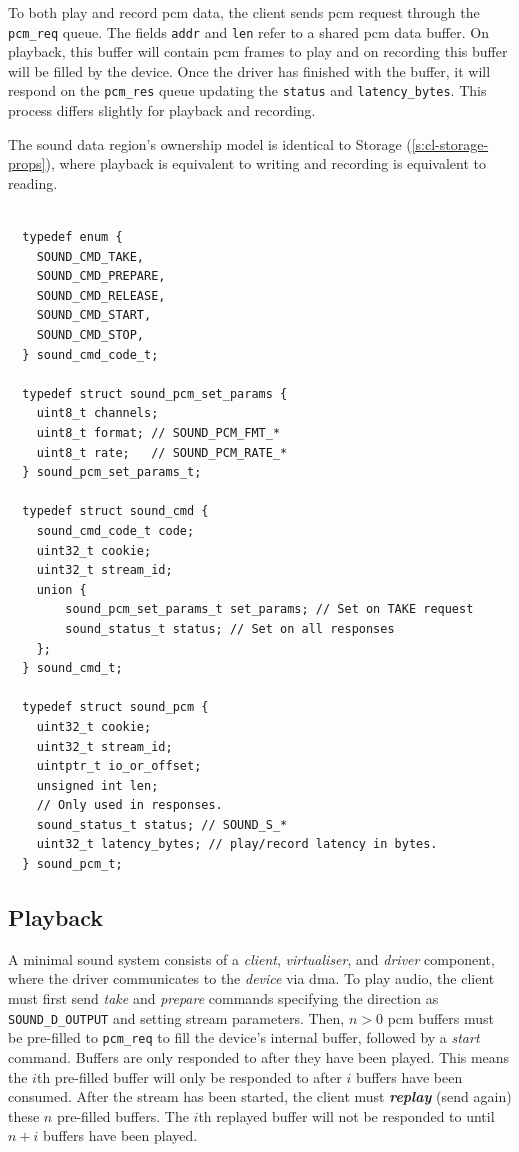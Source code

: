 \documentclass[a4paper,12pt]{report}
\newcommand{\code}[1]{\texttt{#1}}
\begin{document}
To both play and record \gls{pcm} data, the client sends \gls{pcm} request through the
\code{pcm\_req} queue. The fields \code{addr} and \code{len} refer to a shared
\gls{pcm} data buffer. On playback, this buffer will contain \gls{pcm} frames to play and
on recording this buffer will be filled by the device. Once the driver has
finished with the buffer, it will respond on the \code{pcm\_res} queue updating
the \code{status} and \code{latency\_bytes}. This process differs slightly for
playback and recording.

The sound data region's ownership model is identical to Storage
(\autoref{s:cl-storage-props}), where playback is equivalent to writing and
recording is equivalent to reading.

\begin{lstlisting}[gobble=2,firstline=2,float=th,
  label={l:snd_command},
  caption={Sound definitions}]

  typedef enum {
    SOUND_CMD_TAKE,
    SOUND_CMD_PREPARE,
    SOUND_CMD_RELEASE,
    SOUND_CMD_START,
    SOUND_CMD_STOP,
  } sound_cmd_code_t;

  typedef struct sound_pcm_set_params {
    uint8_t channels;
    uint8_t format; // SOUND_PCM_FMT_*
    uint8_t rate;   // SOUND_PCM_RATE_*
  } sound_pcm_set_params_t;

  typedef struct sound_cmd {
    sound_cmd_code_t code;
    uint32_t cookie;
    uint32_t stream_id;
    union {
        sound_pcm_set_params_t set_params; // Set on TAKE request
        sound_status_t status; // Set on all responses
    };
  } sound_cmd_t;

  typedef struct sound_pcm {
    uint32_t cookie;
    uint32_t stream_id;
    uintptr_t io_or_offset;
    unsigned int len;
    // Only used in responses.
    sound_status_t status; // SOUND_S_*
    uint32_t latency_bytes; // play/record latency in bytes.
  } sound_pcm_t;
\end{lstlisting}

\subsection{Playback}

A minimal sound system consists of a \textit{client}, \textit{virtualiser}, and
\textit{driver} component, where the driver communicates to the \textit{device}
via \gls{dma}. To play audio, the client must first send \textit{take} and
\textit{prepare} commands specifying the direction as \code{SOUND\_D\_OUTPUT}
and setting stream parameters. Then, $n>0$ \gls{pcm} buffers must be pre-filled to
\code{pcm\_req} to fill the device's internal buffer, followed by a
\textit{start} command. Buffers are only responded to after they have been
played. This means the $i$th pre-filled buffer will only be responded to after
$i$ buffers have been consumed. After the stream has been started, the client
must \textbf{\textit{replay}} (send again) these $n$ pre-filled buffers. The
$i$th replayed buffer will not be responded to until $n+i$ buffers have been
played.
\end{document}
